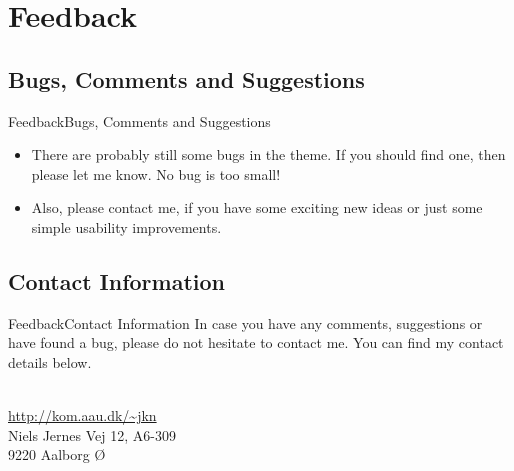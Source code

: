 \documentclass[10pt]{beamer}
\newcommand{\chref}[2]{%
  \href{#1}{{\usebeamercolor[bg]{AAUsimple}#2}}%
}
\begin{document}
\section{Feedback}

\subsection{Bugs, Comments and Suggestions}
\begin{frame}{Feedback}{Bugs, Comments and Suggestions}
  \begin{itemize}
    \item<1-> There are probably still some bugs in the theme. If you should find one, then please let me know. No bug is too small!
    \item<2-> Also, please contact me, if you have some exciting new ideas or just some simple usability improvements.
  \end{itemize}
\end{frame}

\subsection{Contact Information}
\begin{frame}{Feedback}{Contact Information}
In case you have any comments, suggestions or have found a bug, please do not hesitate to contact me. You can find my contact details below.
  \begin{center}
    \insertauthor\\
    \chref{http://kom.aau.dk/~jkn}{http://kom.aau.dk/\textasciitilde jkn}\\
    Niels Jernes Vej 12, A6-309\\
    9220 Aalborg Ø
  \end{center}
\end{frame}

{\aauwavesbg
\begin{frame}
\end{frame}}
\end{document}
